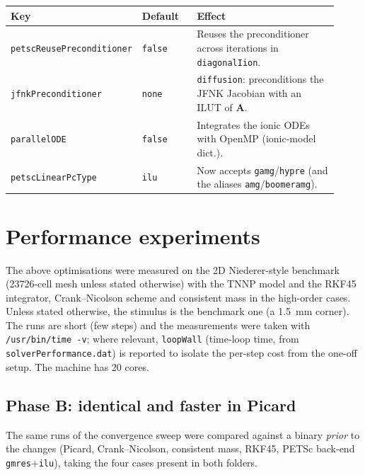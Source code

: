 \documentclass[11pt,a4paper]{article}
\newcommand{\code}[1]{\texttt{\small #1}}
\newcommand{\Aimp}{\mathbf{A}}
\newcommand{\dictkey}[1]{\textcolor{black!60!green}{\texttt{\footnotesize #1}}}
\begin{document}
\begin{center}
\begin{tabular}{@{}p{0.30\linewidth}p{0.17\linewidth}p{0.45\linewidth}@{}}
\toprule
Key & Default & Effect \\
\midrule
\dictkey{petscReusePreconditioner} & \code{false} & Reuses the preconditioner
    across iterations in \dictkey{diagonalIion}. \\
\dictkey{jfnkPreconditioner} & \code{none} & \code{diffusion}: preconditions the
    JFNK Jacobian with an ILUT of $\Aimp$. \\
\dictkey{parallelODE} & \code{false} & Integrates the ionic ODEs with OpenMP
    (ionic-model dict.). \\
\dictkey{petscLinearPcType} & \code{ilu} & Now accepts \code{gamg}/\code{hypre}
    (and the aliases \code{amg}/\code{boomeramg}). \\
\bottomrule
\end{tabular}
\end{center}

\section{Performance experiments}
\label{sec:exp}

The above optimisations were measured on the 2D Niederer-style benchmark
(\num{23726}-cell mesh unless stated otherwise) with the TNNP model and the RKF45
integrator, Crank--Nicolson scheme and consistent mass in the high-order cases.
Unless stated otherwise, the stimulus is the benchmark one (a
\SI{1.5}{\milli\meter} corner). The runs are short (few steps) and the measurements were
taken with \code{/usr/bin/time -v}; where relevant, \code{loopWall}
(time-loop time, from \code{solverPerformance.dat}) is reported to isolate the per-step
cost from the one-off setup. The machine has 20 cores.

\subsection{Phase B: identical and faster in Picard}
\label{sec:exp-B}

The same runs of the convergence sweep were compared against a binary
\emph{prior} to the changes (Picard, Crank--Nicolson, consistent mass, RKF45,
PETSc back-end \code{gmres}+\code{ilu}), taking the four cases present in
both folders.
\end{document}
